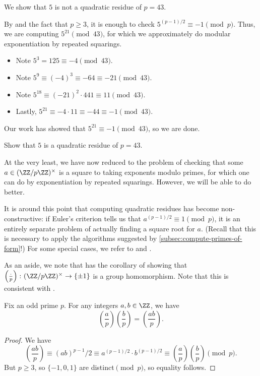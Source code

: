 \documentclass[../notes.tex]{subfiles}
\begin{document}
\begin{example}
	We show that $5$ is not a quadratic residue of $p=43$.
\end{example}
\begin{solution}
	By  and the fact that $p\ge3$, it is enough to check $5^{(p-1)/2}\equiv-1\pmod p$. Thus, we are computing $5^{21}\pmod{43}$, for which we approximately do modular exponentiation by repeated squarings.
	\begin{itemize}
		\item Note $5^3=125\equiv-4\pmod{43}$.
		\item Note $5^9\equiv(-4)^3\equiv-64\equiv-21\pmod{43}$.
		\item Note $5^{18}\equiv(-21)^2\cdot441\equiv11\pmod{43}$.
		\item Lastly, $5^{21}\equiv-4\cdot11\equiv-44\equiv-1\pmod{43}$.
	\end{itemize}
	Our work has showed that $5^{21}\equiv-1\pmod{43}$, so we are done.
\end{solution}
\begin{exe}
	Show that $5$ is a quadratic residue of $p=43$.
\end{exe}
At the very least, we have now reduced to the problem of checking that some $a\in(\ZZ/p\ZZ)^\times$ is a square to taking exponents modulo primes, for which one can do by exponentiation by repeated squarings. However, we will be able to do better.
\begin{remark}
	It is around this point that computing quadratic residues has become non-constructive: if Euler's criterion tells us that $a^{(p-1)/2}\equiv1\pmod p$, it is an entirely separate problem of actually finding a square root for $a$. (Recall that this is necessary to apply the algorithms suggested by \cref{subsec:compute-primes-of-form}!) For some special cases, we refer to  and .
\end{remark}
As an aside, we note that  has the corollary of showing that $\left(\frac\cdot p\right)\colon(\ZZ/p\ZZ)^\times\to\{\pm1\}$ is a group homomorphism. Note that this is consistent with .
\begin{corollary} \label{cor:leg-symbol-is-char}
	Fix an odd prime $p$. For any integers $a,b\in\ZZ$, we have
	\[\left(\frac ap\right)\left(\frac bp\right)=\left(\frac{ab}p\right).\]
\end{corollary}
\begin{proof}
	We have
	\[\left(\frac{ab}p\right)\equiv(ab)^{p-1}/2\equiv a^{(p-1)/2}\cdot b^{(p-1)/2}\equiv\left(\frac ap\right)\left(\frac bp\right)\pmod p.\]
	But $p\ge3$, so $\{-1,0,1\}$ are distinct$\pmod p$, so equality follows.
\end{proof}
\end{document}
